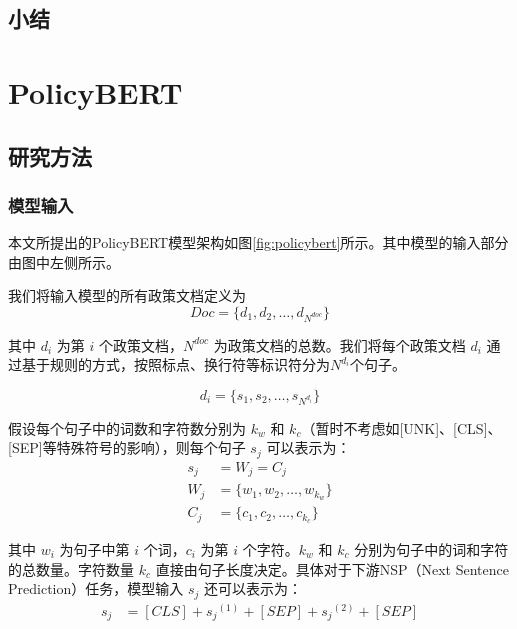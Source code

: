 \documentclass[12pt, a4paper]{ctexart}
\begin{document}
\subsection{小结}

\section{PolicyBERT}
\subsection{研究方法}

\subsubsection{模型输入}
本文所提出的PolicyBERT模型架构如图\ref{fig:policybert}所示。其中模型的输入部分由图中左侧所示。

我们将输入模型的所有政策文档定义为 
\begin{equation}
    Doc = \{d_1, d_2, \dots, d_{N^{doc}}\} 
\end{equation}

其中 $d_i$ 为第 $i$ 个政策文档，${N^{doc}}$ 为政策文档的总数。我们将每个政策文档 $d_i$ 通过基于规则的方式，按照标点、换行符等标识符分为$N^{d_i}$个句子。 

\begin{equation}
   d_i = \{s_1, s_2, \dots, s_{N^{d_i}}\} 
\end{equation}

假设每个句子中的词数和字符数分别为 $k_w$ 和 $k_c$（暂时不考虑如[UNK]、[CLS]、[SEP]等特殊符号的影响），则每个句子 $s_j$ 可以表示为：
\begin{equation}
    \begin{split}
        s_j &= W_j = C_j \\
        W_j &= \{w_1, w_2, \dots, w_{k_w}\} \\
        C_j &= \{c_1, c_2, \dots, c_{k_c}\}
    \end{split}
\end{equation}

其中 $w_i$ 为句子中第 $i$ 个词，$c_i$ 为第 $i$ 个字符。$k_w$ 和 $k_c$ 分别为句子中的词和字符的总数量。字符数量 $k_c$ 直接由句子长度决定。具体对于下游NSP（Next Sentence Prediction）任务，模型输入 $s_j$ 还可以表示为：
\begin{equation}
    \begin{split}
        s_j &= [CLS] + {s_j}^{(1)} + [SEP] + {s_j}^{(2)} + [SEP] \\
    \end{split}
\end{equation} 
\end{document}
